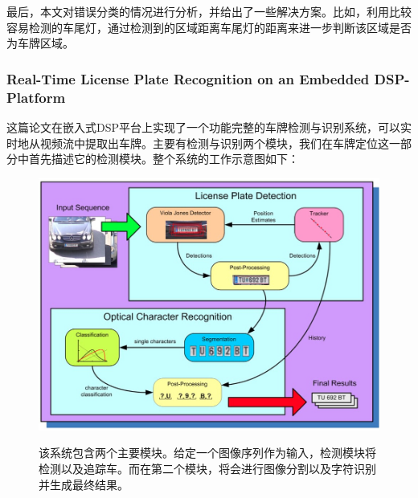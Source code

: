 最后，本文对错误分类的情况进行分析，并给出了一些解决方案。比如，利用比较容易检测的车尾灯，通过检测到的区域距离车尾灯的距离来进一步判断该区域是否为车牌区域。

\subsubsection{Real-Time License Plate Recognition on an Embedded DSP-Platform}
这篇论文\cite{rtl_plate_recoginition_on_edsp}在嵌入式DSP平台上实现了一个功能完整的车牌检测与识别系统，可以实时地从视频流中提取出车牌。主要有检测与识别两个模块，我们在车牌定位这一部分中首先描述它的检测模块。整个系统的工作示意图如下：
\begin{figure}[H]
    \centering 
    \includegraphics[width=1\textwidth]{image/2_1_4_1.jpg}    
    \label{logic}
    \caption{该系统包含两个主要模块。给定一个图像序列作为输入，检测模块将检测以及追踪车。而在第二个模块，将会进行图像分割以及字符识别并生成最终结果。}
\end{figure}
